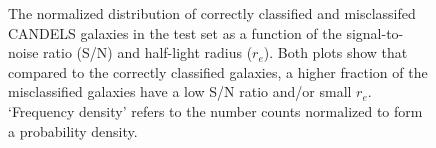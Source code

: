 \documentclass[twocolumn]{aastex63}
\begin{document}
\begin{figure}[htb]
	\begin{center}
  \end{center}
  \caption{The normalized distribution of correctly classified and misclassifed CANDELS galaxies in the test set as a function of the signal-to-noise ratio (S/N) and half-light radius ($r_e$). Both plots show that compared to the correctly classified galaxies, a higher fraction of the misclassified galaxies have a low S/N ratio and/or small $r_e$. `Frequency density' refers to the number counts normalized to form a probability density.}
  \label{fig:candels_misclf}
\end{figure}
\end{document}
